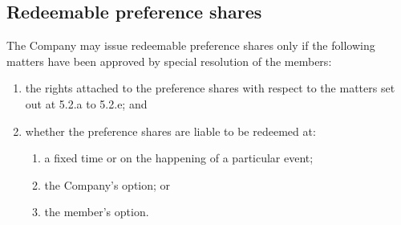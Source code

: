 \subsection{Redeemable preference shares}

The Company may issue redeemable preference shares only if the following matters have been approved by special resolution of the members:

\begin{enumerate}[label=(\alph*)]
    \item the rights attached to the preference shares with respect to the matters set out at 5.2.a to 5.2.e; and
    
    \item whether the preference shares are liable to be redeemed at:
    \begin{enumerate}[label=(\roman*)]
        \item a fixed time or on the happening of a particular event;
        \item the Company's option; or
        \item the member's option.
    \end{enumerate}
\end{enumerate} 